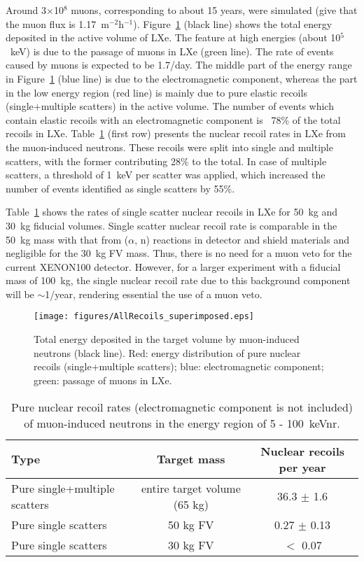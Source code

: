 Around 3$\times$10$^8$ muons, corresponding to about 15 years, were simulated (give that the muon flux is 1.17~m$^{-2}$h$^{-1}$).
Figure~\ref{totalE} (black line) shows the total energy deposited in the active volume of
LXe. The feature at high energies (about 10$^5$~keV) is due to the
passage of muons in LXe (green line). 
The rate of events caused by muons is expected to be 1.7/day. 
The middle part of the energy range in Figure~\ref{totalE} (blue line) is due to the
electromagnetic component, whereas the part in the low energy region (red line) is mainly
due to pure elastic recoils (single+multiple scatters) in the active volume. The number of events which contain elastic
recoils with an electromagnetic component is ~78\% of the total recoils in LXe. 
Table~\ref{tab:nrecoils-muons} (first row) presents the nuclear recoil rates in LXe from the muon-induced neutrons.  
These recoils were split into single and multiple scatters, with the former
contributing 28\% to the total.
In case of multiple scatters, a threshold of 1~keV per scatter was applied, which increased the number of events identified as single scatters by 55\%.

Table~\ref{tab:nrecoils-muons} shows the rates of single scatter nuclear
recoils in LXe for 50~kg and 30~kg fiducial volumes. Single scatter nuclear
recoil rate is comparable in the 50~kg mass with that from ($\alpha$, n) reactions in
detector and shield materials 
and negligible for the 30~kg FV mass. Thus, there is  no need for a muon veto
for the current XENON100 detector.
However, for a larger experiment with a fiducial mass of 100~kg, the single nuclear recoil rate due
to this background component will be $\sim$1/year, rendering essential the use of a muon veto.

\begin{figure}[t!]
\begin{center}
\texttt{[image: figures/AllRecoils\_superimposed.eps]}
\end{center}
\caption{Total energy deposited in the target volume by muon-induced neutrons (black line).
Red: energy distribution of pure nuclear recoils (single+multiple scatters); blue: electromagnetic 
component; green: passage of muons in LXe.}
\label{totalE}
\end{figure}
 
\begin{table}[ht]
\centering
\caption{Pure nuclear recoil rates (electromagnetic component is not included) of muon-induced neutrons in the energy region of 5 - 100~keVnr.}
\vspace{0.3cm}
\begin{tabular}{lcc}
\hline
\bf{Type} & \bf{Target mass}  & \bf{Nuclear recoils per year}\\
\hline
Pure single+multiple scatters & entire target volume (65 kg) & 36.3 $\pm$ 1.6 \\
Pure single scatters  & 50 kg FV & 0.27 $\pm$ 0.13  \\
Pure single scatters  & 30 kg FV & $<$ 0.07 \\
\hline
\end{tabular}
\label{tab:nrecoils-muons}
\end{table}


